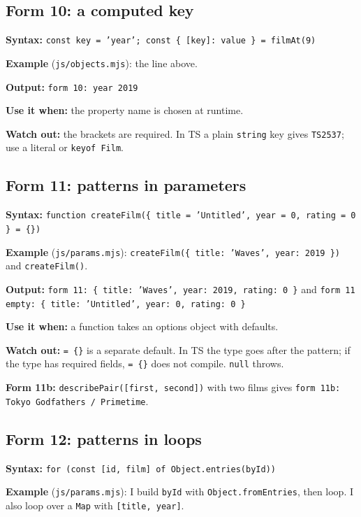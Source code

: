 \documentclass[
  11pt,
]{article}
\begin{document}
\subsection{Form 10: a computed key}\label{form-10-a-computed-key}

\textbf{Syntax:}
\texttt{const key = 'year'; const \{ [key]: value \} = filmAt(9)}

\textbf{Example} (\texttt{js/objects.mjs}): the line
above.

\textbf{Output:} \texttt{form 10: year 2019}

\textbf{Use it when:} the property name is chosen at runtime.

\textbf{Watch out:} the brackets are required. In TS a plain
\texttt{string} key gives
\texttt{TS2537}; use a literal or
\texttt{keyof Film}.

\subsection{Form 11: patterns in
parameters}\label{form-11-patterns-in-parameters}

\textbf{Syntax:}
\texttt{function createFilm(\{ title = 'Untitled', year = 0, rating = 0 \} = \{\})}

\textbf{Example} (\texttt{js/params.mjs}):
\texttt{createFilm(\{ title: 'Waves', year: 2019 \})}
and \texttt{createFilm()}.

\textbf{Output:}
\texttt{form 11: \{ title: 'Waves', year: 2019, rating: 0 \}}
and
\texttt{form 11 empty: \{ title: 'Untitled', year: 0, rating: 0 \}}

\textbf{Use it when:} a function takes an options object with defaults.

\textbf{Watch out:} \texttt{= \{\}} is a separate
default. In TS the type goes after the pattern; if the type has required
fields, \texttt{= \{\}} does not compile.
\texttt{null} throws.

\textbf{Form 11b:}
\texttt{describePair([first, second])} with two films
gives \texttt{form 11b: Tokyo Godfathers / Primetime}.

\subsection{Form 12: patterns in loops}\label{form-12-patterns-in-loops}

\textbf{Syntax:}
\texttt{for (const [id, film] of Object.entries(byId))}

\textbf{Example} (\texttt{js/params.mjs}): I build
\texttt{byId} with
\texttt{Object.fromEntries}, then loop. I also loop
over a \texttt{Map} with
\texttt{[title, year]}.
\end{document}

